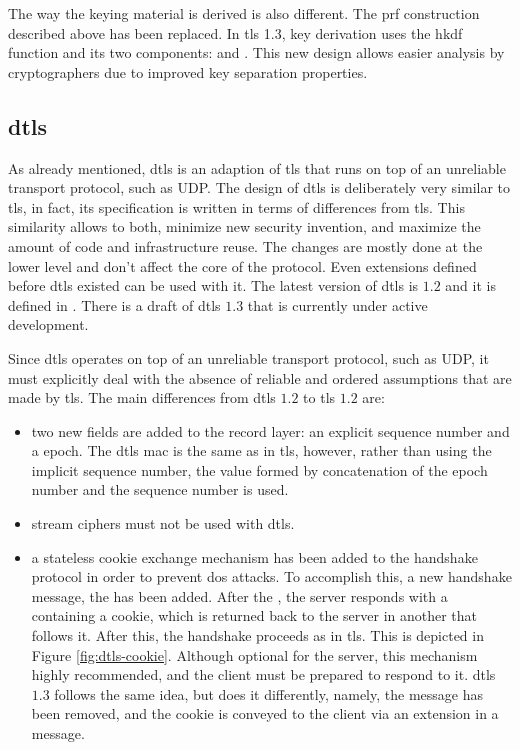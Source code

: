 \documentclass{llncs}
\begin{document}
{The way the keying material is derived is also different. The
\gls{prf} construction described above has been replaced.
In \gls{tls} 1.3, key derivation uses the
\gls{hkdf} function \cite{RFC5869} and its two components:  and .
This new design allows easier analysis by cryptographers due to improved
key separation properties.

%
\subsection{\gls{dtls}} \label{dtls}

As already mentioned, \gls{dtls} is an adaption of \gls{tls} that runs on
top of an unreliable transport protocol, such as UDP. The design of \gls{dtls} is deliberately very similar to \gls{tls}, in fact, its specification is written
in terms of differences from \gls{tls}. This similarity allows to
both, minimize new security invention, and maximize the amount of code and infrastructure reuse. The changes are mostly done at the lower level and
don't affect the core of the protocol.
Even extensions defined before \gls{dtls} existed can be
used with it. The latest version of \gls{dtls} is $1.2$ and it is defined
in \cite{RFC6347}. There is a draft of \gls{dtls} $1.3$
\cite{I-D.ietf-tls-dtls13} that is currently under active development.

Since \gls{dtls} operates on top of an unreliable transport protocol, such as
UDP, it must explicitly deal with the absence of reliable and ordered assumptions
that are made by \gls{tls}. The main differences from \gls{dtls} $1.2$ to \gls{tls} $1.2$ are:

\begin{itemize}
  \item two new fields are added to the record layer: an explicit  sequence
  number and a  epoch. The \gls{dtls} \gls{mac} is the same as in \gls{tls},
  however, rather than using the implicit sequence number, the  value
  formed by concatenation of the epoch number and the sequence number is used.

  \item stream ciphers must not be used with \gls{dtls}.

  \item a stateless cookie exchange mechanism has been added to the handshake protocol
  in order to prevent \gls{dos} attacks. To accomplish this, a new handshake
  message, the  has been added. After
  the , the server responds with a 
  containing a cookie, which is returned back to the server in another
   that follows it. After this, the handshake proceeds as in \gls{tls}. This is depicted in Figure \ref{fig:dtls-cookie}.   Although optional for the server, this mechanism highly recommended, and the
  client must be prepared to respond to it. \gls{dtls} $1.3$ follows the same idea, but does it differently, namely,
  the  message has been removed, and the cookie is conveyed to the client via an extension in a  message.


\end{itemize}}
\end{document}
